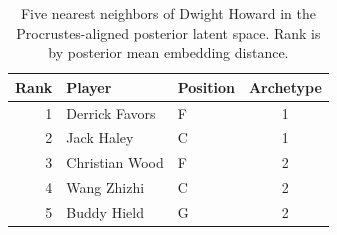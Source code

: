 \begin{table}[htbp]
  \centering\small
  \begin{tabular}{rllc}
    \toprule
    Rank & Player & Position & Archetype \\
    \midrule
    1 & Derrick Favors & F & 1 \\
    2 & Jack Haley & C & 1 \\
    3 & Christian Wood & F & 2 \\
    4 & Wang Zhizhi & C & 2 \\
    5 & Buddy Hield & G & 2 \\
    \bottomrule
  \end{tabular}
  \caption{Five nearest neighbors of Dwight Howard in the Procrustes-aligned posterior latent space. Rank is by posterior mean embedding distance.}
  \label{tab:Dwight_Howard_neighbors}
\end{table}

